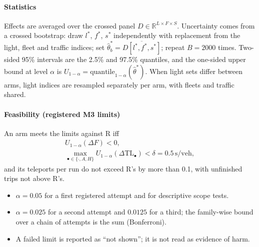 \paragraph{Statistics} Effects are averaged over the crossed panel $D\in\mathbb R^{L\times F\times S}$. Uncertainty comes from a crossed
bootstrap: draw $l^*$, $f^*$, $s^*$ independently with replacement from the light, fleet and traffic indices; set
$\hat\theta^*_b=\overline{D[l^*,f^*,s^*]}$; repeat $B=2000$ times. Two-sided 95\% intervals are the 2.5\% and 97.5\% quantiles, and the
one-sided upper bound at level $\alpha$ is $U_{1-\alpha}=\mathrm{quantile}_{1-\alpha}(\hat\theta^*)$. When light sets differ between
arms, light indices are resampled separately per arm, with fleets and traffic shared.
\paragraph{Feasibility (registered M3 limits)} An arm meets the limits against R iff
\begin{gather}
U_{1-\alpha}(\Delta F)<0,\\
\max_{\bullet\in\{\cdot,A,H\}}U_{1-\alpha}(\Delta\mathrm{TL}_\bullet)<\delta=0.5\,\mathrm{s/veh},
\end{gather}
and its teleports per run do not exceed R's by more than 0.1, with unfinished trips not above R's.
\begin{itemize}\setlength\itemsep{0pt}
\item $\alpha=0.05$ for a first registered attempt and for descriptive scope tests.
\item $\alpha=0.025$ for a second attempt and $0.0125$ for a third; the family-wise bound over a chain of attempts is the sum (Bonferroni).
\item A failed limit is reported as ``not shown''; it is not read as evidence of harm.
\end{itemize}

